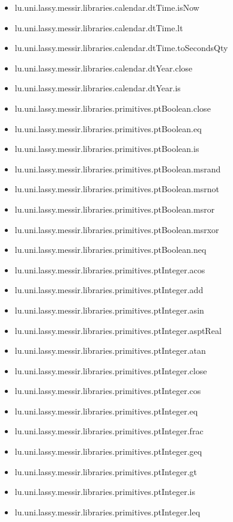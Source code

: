 \begin{itemize}
\item lu.uni.lassy.messir.libraries.calendar.dtTime.isNow 
\item lu.uni.lassy.messir.libraries.calendar.dtTime.lt 
\item lu.uni.lassy.messir.libraries.calendar.dtTime.toSecondsQty 
\item lu.uni.lassy.messir.libraries.calendar.dtYear.close 
\item lu.uni.lassy.messir.libraries.calendar.dtYear.is 
\item lu.uni.lassy.messir.libraries.primitives.ptBoolean.close 
\item lu.uni.lassy.messir.libraries.primitives.ptBoolean.eq 
\item lu.uni.lassy.messir.libraries.primitives.ptBoolean.is 
\item lu.uni.lassy.messir.libraries.primitives.ptBoolean.msrand 
\item lu.uni.lassy.messir.libraries.primitives.ptBoolean.msrnot 
\item lu.uni.lassy.messir.libraries.primitives.ptBoolean.msror 
\item lu.uni.lassy.messir.libraries.primitives.ptBoolean.msrxor 
\item lu.uni.lassy.messir.libraries.primitives.ptBoolean.neq 
\item lu.uni.lassy.messir.libraries.primitives.ptInteger.acos 
\item lu.uni.lassy.messir.libraries.primitives.ptInteger.add 
\item lu.uni.lassy.messir.libraries.primitives.ptInteger.asin 
\item lu.uni.lassy.messir.libraries.primitives.ptInteger.asptReal 
\item lu.uni.lassy.messir.libraries.primitives.ptInteger.atan 
\item lu.uni.lassy.messir.libraries.primitives.ptInteger.close 
\item lu.uni.lassy.messir.libraries.primitives.ptInteger.cos 
\item lu.uni.lassy.messir.libraries.primitives.ptInteger.eq 
\item lu.uni.lassy.messir.libraries.primitives.ptInteger.frac 
\item lu.uni.lassy.messir.libraries.primitives.ptInteger.geq 
\item lu.uni.lassy.messir.libraries.primitives.ptInteger.gt 
\item lu.uni.lassy.messir.libraries.primitives.ptInteger.is 
\item lu.uni.lassy.messir.libraries.primitives.ptInteger.leq 

\end{itemize}
